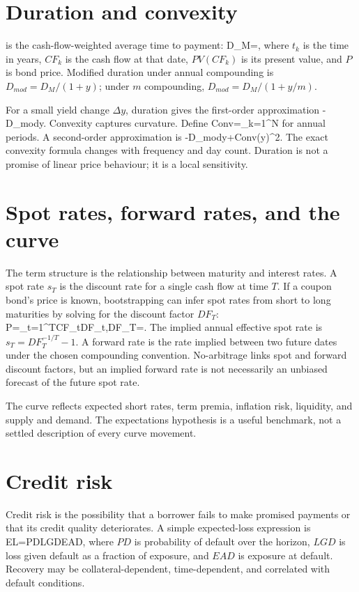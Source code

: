 \section{Duration and convexity}
 is the cash-flow-weighted average time to payment:
  D_M=,
\closeformula
where $t_k$ is the time in years, $CF_k$ is the cash flow at that date, $PV(CF_k)$ is its present value, and $P$ is bond price. Modified duration under annual compounding is $D_{mod}=D_M/(1+y)$; under $m$ compounding, $D_{mod}=D_M/(1+y/m)$.

For a small yield change $\Delta y$, duration gives the first-order approximation
  \approx-D_{mod}\Delta y.
\closeformula
Convexity captures curvature. Define
  Conv=\sum_{k=1}^{N}
\closeformula
for annual periods. A second-order approximation is
  \approx-D_{mod}\Delta y+Conv(\Delta y)^2.
\closeformula
The exact convexity formula changes with frequency and day count. Duration is not a promise of linear price behaviour; it is a local sensitivity.

\section{Spot rates, forward rates, and the curve}
The term structure is the relationship between maturity and interest rates. A spot rate $s_T$ is the discount rate for a single cash flow at time $T$. If a coupon bond's price is known, bootstrapping can infer spot rates from short to long maturities by solving for the discount factor $DF_T$:
  P=\sum_{t=1}^{T}CF_tDF_t,\qquad DF_T=.
\closeformula
The implied annual effective spot rate is $s_T=DF_T^{-1/T}-1$. A forward rate is the rate implied between two future dates under the chosen compounding convention. No-arbitrage links spot and forward discount factors, but an implied forward rate is not necessarily an unbiased forecast of the future spot rate.

The curve reflects expected short rates, term premia, inflation risk, liquidity, and supply and demand. The expectations hypothesis is a useful benchmark, not a settled description of every curve movement.

\section{Credit risk}
Credit risk is the possibility that a borrower fails to make promised payments or that its credit quality deteriorates. A simple expected-loss expression is
  EL=PD\times LGD\times EAD,
\closeformula
where $PD$ is probability of default over the horizon, $LGD$ is loss given default as a fraction of exposure, and $EAD$ is exposure at default. Recovery may be collateral-dependent, time-dependent, and correlated with default conditions.

